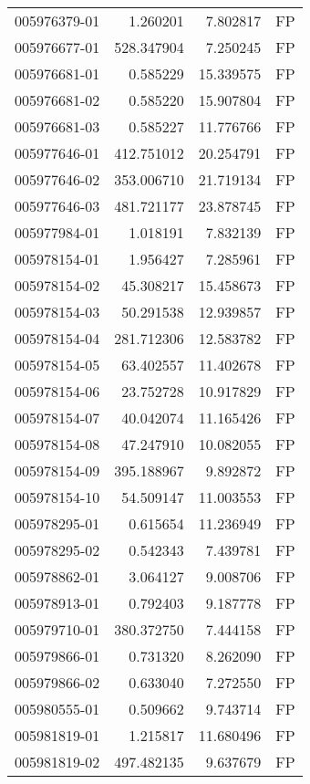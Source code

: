 \begin{tabular}{lrrl}
005976379-01 &    1.260201 &     7.802817 &   FP \\
005976677-01 &  528.347904 &     7.250245 &   FP \\
005976681-01 &    0.585229 &    15.339575 &   FP \\
005976681-02 &    0.585220 &    15.907804 &   FP \\
005976681-03 &    0.585227 &    11.776766 &   FP \\
005977646-01 &  412.751012 &    20.254791 &   FP \\
005977646-02 &  353.006710 &    21.719134 &   FP \\
005977646-03 &  481.721177 &    23.878745 &   FP \\
005977984-01 &    1.018191 &     7.832139 &   FP \\
005978154-01 &    1.956427 &     7.285961 &   FP \\
005978154-02 &   45.308217 &    15.458673 &   FP \\
005978154-03 &   50.291538 &    12.939857 &   FP \\
005978154-04 &  281.712306 &    12.583782 &   FP \\
005978154-05 &   63.402557 &    11.402678 &   FP \\
005978154-06 &   23.752728 &    10.917829 &   FP \\
005978154-07 &   40.042074 &    11.165426 &   FP \\
005978154-08 &   47.247910 &    10.082055 &   FP \\
005978154-09 &  395.188967 &     9.892872 &   FP \\
005978154-10 &   54.509147 &    11.003553 &   FP \\
005978295-01 &    0.615654 &    11.236949 &   FP \\
005978295-02 &    0.542343 &     7.439781 &   FP \\
005978862-01 &    3.064127 &     9.008706 &   FP \\
005978913-01 &    0.792403 &     9.187778 &   FP \\
005979710-01 &  380.372750 &     7.444158 &   FP \\
005979866-01 &    0.731320 &     8.262090 &   FP \\
005979866-02 &    0.633040 &     7.272550 &   FP \\
005980555-01 &    0.509662 &     9.743714 &   FP \\
005981819-01 &    1.215817 &    11.680496 &   FP \\
005981819-02 &  497.482135 &     9.637679 &   FP \\

\end{tabular}
